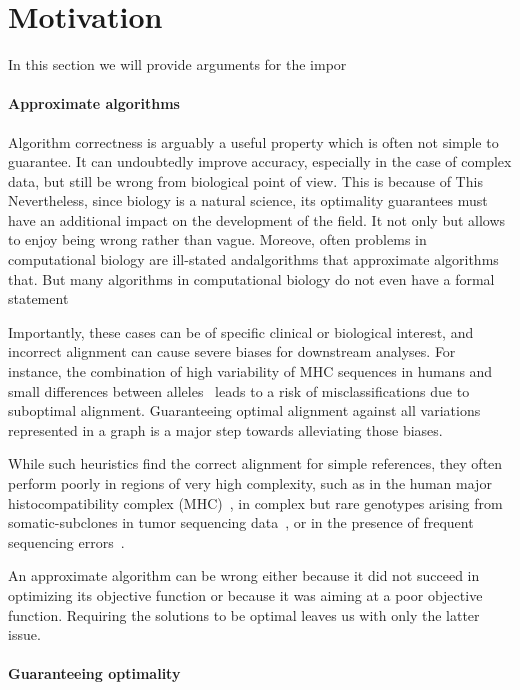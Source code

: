 \section*{Motivation}

In this section we will provide arguments for the impor

\paragraph{Approximate algorithms}

Algorithm correctness is arguably a useful property which is often not simple to
guarantee. It can undoubtedly improve accuracy, especially in the case of
complex data, but still be wrong from biological point of view. This is because
of  This Nevertheless, since biology is a natural science, its  optimality
guarantees must have an additional impact on the development of the field. It
not only but allows to enjoy being wrong rather than vague. Moreove, often
problems in computational biology are ill-stated andalgorithms that approximate
algorithms that. But many algorithms in computational biology do not even have a
formal statement 

Importantly, these cases can be of specific clinical or biological interest, and
incorrect alignment can cause severe biases for downstream analyses. For
instance, the combination of high variability of MHC sequences in humans and
small differences between alleles~\cite{buhler_hla_2011} leads to a risk of
misclassifications due to suboptimal alignment. Guaranteeing optimal alignment
against all variations represented in a graph is a major step towards
alleviating those biases.

While such heuristics find the correct alignment for simple references, they
often perform poorly in regions of very high complexity, such as in the human
major histocompatibility complex (MHC)~\cite{dilthey_improved_2015}, in complex
but rare genotypes arising from somatic-subclones in tumor sequencing
data~\cite{harismendy_detection_2011}, or in the presence of frequent sequencing
errors~\cite{salmela_lordec_2014}.

An approximate algorithm can be wrong either because it did not succeed in
optimizing its objective function or because it was aiming at a poor objective
function. Requiring the solutions to be optimal leaves us with only the latter
issue.

\paragraph{Guaranteeing optimality}

